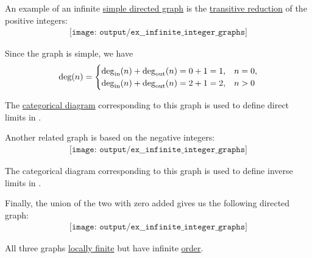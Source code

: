 \begin{example}\label{ex:infinite_integer_graphs}
  An example of an infinite \hyperref[def:directed_graph]{simple directed graph} is the \hyperref[def:transitive_reduction]{transitive reduction} of the positive integers:
  \begin{equation}\label{eq:ex:infinite_integer_graphs/positive}
    \begin{aligned}
      \texttt{[image: output/ex\_\_infinite\_integer\_graphs]}
    \end{aligned}
  \end{equation}

  Since the graph is simple, we have
  \begin{equation*}
    \deg(n) = \begin{cases}
      \deg_{\op{in}}(n) + \deg_{\op{out}}(n) = 0 + 1 = 1, &n = 0, \\
      \deg_{\op{in}}(n) + \deg_{\op{out}}(n) = 2 + 1 = 2, &n > 0 \\
    \end{cases}
  \end{equation*}

  The \hyperref[def:categorical_diagram]{categorical diagram} corresponding to this graph is used to define direct limits in .

  Another related graph is based on the negative integers:
  \begin{equation}\label{eq:ex:infinite_integer_graphs/negative}
    \begin{aligned}
      \texttt{[image: output/ex\_\_infinite\_integer\_graphs]}
    \end{aligned}
  \end{equation}

  The categorical diagram corresponding to this graph is used to define inverse limits in .

  Finally, the union of the two with zero added gives us the following directed graph:
  \begin{equation}\label{eq:ex:infinite_integer_graphs/two_sided}
    \begin{aligned}
      \texttt{[image: output/ex\_\_infinite\_integer\_graphs]}
    \end{aligned}
  \end{equation}

  All three graphs \hyperref[def:graph_cardinality/local]{locally finite} but have infinite \hyperref[def:graph_cardinality/order]{order}.
\end{example}
